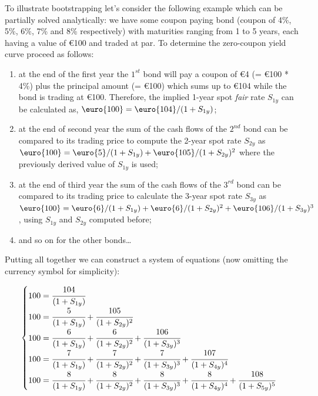 To illustrate bootstrapping let's consider the following example which can be partially solved analytically: we have some coupon paying bond (coupon of 4\%, 5\%, 6\%, 7\% and 8\% respectively) with maturities ranging from 1 to 5 years, each having a value of \euro{100} and traded at par. To determine the zero-coupon yield curve proceed as follows:

\begin{enumerate}
\item at the end of the first year the $1^{st}$ bond will pay a coupon of \euro{4} (= \euro{100} * 4\%) plus the principal amount (= \euro{100}) which sums up to \euro{104} while the bond is trading at \euro{100}. Therefore, the implied 1-year spot \emph{fair} rate $S_{1y}$ can be calculated as, $\mbox{\euro{100}} = \mbox{\euro{104}} / (1 + S_{1y})$;

\item at the end of second year the sum of the cash flows of the $2^{nd}$ bond can be compared to its trading price to compute the 2-year spot rate $S_{2y}$ as $\mbox{\euro{100}} = \mbox{\euro{5}} / (1 + S_{1y}) + \mbox{\euro{105}} / (1 + S_{2y})^{2}$ where the previously derived value of $S_{1y}$ is used;

\item at the end of third year the sum of the cash flows of the $3^{rd}$ bond can be compared to its trading price to calculate the 3-year spot rate $S_{3y}$ as $\mbox{\euro{100}} = \mbox{\euro{6}} / (1 + S_{1y}) + \mbox{\euro{6}} / (1 + S_{2y})^{2} + \mbox{\euro{106}} / (1 + S_{3y})^{3}$, using $S_{1y}$ and $S_{2y}$ computed before;

\item and so on for the other bonds\ldots
\end{enumerate}

Putting all together we can construct a system of equations (now omitting the currency symbol for simplicity):

\begin{equation}
\begin{cases}
100 = \cfrac{104}{(1 + S_{1y})} \\
100 = \cfrac{5}{(1 + S_{1y})} + \cfrac{105}{(1 + S_{2y})^{2}} \\
100 = \cfrac{6} {(1 + S_{1y})} + \cfrac{6}{(1 + S_{2y})^{2}} + \cfrac{106} {(1 + S_{3y})^{3}} \\
100 = \cfrac{7} {(1 + S_{1y})} + \cfrac{7} {(1 + S_{2y})^{2}} + \cfrac{7} {(1 + S_{3y})^{3}} + \cfrac{107} {(1 + S_{4y})^{4}} \\
100 = \cfrac{8} {(1 + S_{1y})} + \cfrac{8} {(1 + S_{2y})^{2}}+ \cfrac{8} {(1 + S_{3y})^{3}} + \cfrac{8} {(1 + S_{4y})^{4}} + \cfrac{108} {(1 + S_{5y})^{5}}
\end{cases}
\label{eq:fifth_year_rate}
\end{equation}

